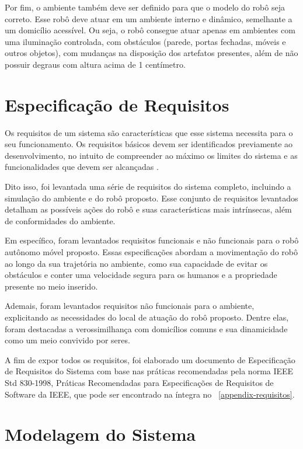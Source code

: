 Por fim, o ambiente também deve ser definido para que o modelo do robô seja correto. Esse robô deve atuar em um ambiente interno e dinâmico, semelhante a um domicílio acessível. Ou seja, o robô consegue atuar apenas em ambientes com uma iluminação controlada, com obstáculos  (parede, portas fechadas, móveis e outros objetos), com  mudanças na disposição dos artefatos presentes, além de não possuir degraus com altura acima de 1 centímetro.

\section{Especificação de Requisitos}

Os requisitos de um sistema são características que esse sistema necessita para o seu funcionamento. Os requisitos básicos devem ser identificados previamente ao desenvolvimento, no intuito de compreender ao máximo os limites do sistema e as funcionalidades que devem ser alcançadas \cite{pressman}.

Dito isso, foi  levantada uma série de requisitos do sistema completo, incluindo a simulação do ambiente e do robô proposto. Esse conjunto de requisitos levantados detalham as possíveis ações do robô e suas características mais intrínsecas, além de conformidades do ambiente. 

Em específico, foram levantados requisitos funcionais e não funcionais para o robô autônomo móvel proposto. Essas especificações abordam a movimentação do robô ao longo da sua trajetória no ambiente, como sua capacidade de evitar os obstáculos e conter uma velocidade segura para os humanos e a propriedade presente no meio inserido.

Ademais, foram levantados requisitos não funcionais para o ambiente, explicitando as necessidades do local de atuação do robô proposto. Dentre elas, foram destacadas a verossimilhança com domicílios comuns e sua dinamicidade como um meio convivido por seres.

A fim de expor todos os requisitos, foi elaborado um documento de Especificação de Requisitos do Sistema  com base nas práticas recomendadas pela norma IEEE Std 830-1998, Práticas Recomendadas para Especificações de Requisitos de Software da IEEE,  que pode ser encontrado na íntegra no \appendixautorefname~\ref{appendix-requisitos}.

\section{Modelagem do Sistema}

